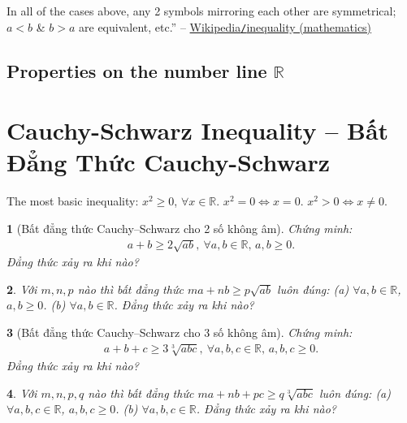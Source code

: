 \documentclass{article}
\newtheorem{baitoan}{}
\begin{document}
In all of the cases above, any 2 symbols mirroring each other are symmetrical; $a < b$ \& $b > a$ are equivalent, etc.'' -- \href{https://en.wikipedia.org/wiki/Inequality_(mathematics)}{Wikipedia\texttt{/}inequality (mathematics)}

\subsection{Properties on the number line $\mathbb{R}$}



\section{Cauchy-Schwarz Inequality -- Bất Đẳng Thức Cauchy-Schwarz}
The most basic inequality: $x^2\ge0$, $\forall x\in\mathbb{R}$. $x^2 = 0\Leftrightarrow x = 0$. $x^2 > 0\Leftrightarrow x\ne0$.

\begin{baitoan}[Bất đẳng thức Cauchy--Schwarz cho 2 số không âm]
	Chứng minh:
	\begin{align*}
		\boxed{a + b\ge2\sqrt{ab},\ \forall a,b\in\mathbb{R},\,a,b\ge 0.}
	\end{align*}
	Đẳng thức xảy ra khi nào?
\end{baitoan}

\begin{baitoan}
	Với $m,n,p$ nào thì bất đẳng thức $ma + nb\ge p\sqrt{ab}$ luôn đúng: (a) $\forall a,b\in\mathbb{R}$, $a,b\ge0$. (b) $\forall a,b\in\mathbb{R}$. Đẳng thức xảy ra khi nào?
\end{baitoan}

\begin{baitoan}[Bất đẳng thức Cauchy--Schwarz cho 3 số không âm]
	Chứng minh:
	\begin{align*}
		\boxed{a + b + c\ge3\sqrt[3]{abc},\ \forall a,b,c\in\mathbb{R},\,a,b,c\ge 0.}
	\end{align*}
	Đẳng thức xảy ra khi nào?
\end{baitoan}

\begin{baitoan}
	Với $m,n,p,q$ nào thì bất đẳng thức $ma + nb + pc\ge q\sqrt[3]{abc}$ luôn đúng: (a) $\forall a,b,c\in\mathbb{R}$, $a,b,c\ge0$. (b) $\forall a,b,c\in\mathbb{R}$. Đẳng thức xảy ra khi nào?
\end{baitoan}
\end{document}
